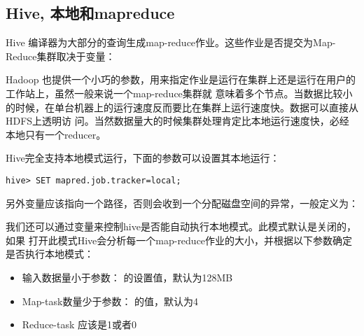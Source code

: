 \documentclass{article}
\begin{document}
\subsection{Hive, 本地和mapreduce}
Hive 编译器为大部分的查询生成map-reduce作业。这些作业是否提交为Map-Reduce集群取决于变量：

Hadoop 也提供一个小巧的参数，用来指定作业是运行在集群上还是运行在用户的工作站上，虽然一般来说一个map-reduce集群就
意味着多个节点。当数据比较小的时候，在单台机器上的运行速度反而要比在集群上运行速度快。数据可以直接从HDFS上透明访
问。当然数据量大的时候集群处理肯定比本地运行速度快，必经本地只有一个reducer。

Hive完全支持本地模式运行，下面的参数可以设置其本地运行：

\begin{verbatim}
hive> SET mapred.job.tracker=local;
\end{verbatim}

另外变量应该指向一个路径，否则会收到一个分配磁盘空间的异常，一般定义为：

我们还可以通过变量来控制hive是否能自动执行本地模式。此模式默认是关闭的，如果
打开此模式Hive会分析每一个map-reduce作业的大小，并根据以下参数确定是否执行本地模式：

\begin{itemize}
\item 输入数据量小于参数： 的设置值，默认为128MB
\item Map-task数量少于参数： 的值，默认为4
\item Reduce-task 应该是1或者0
\end{itemize}
\end{document}
